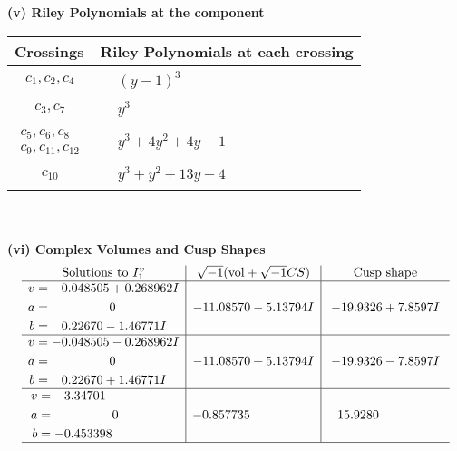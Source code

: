 \documentclass[1p]{elsarticle_modified}
\theoremstyle{definition}
\newcommand{\I}{\sqrt{-1}}
\begin{document}
\newpage\renewcommand{\arraystretch}{1}
\flushleft \textbf{(v) Riley Polynomials at the component}\newline \\
\begin{tabular}{m{50pt}|m{274pt}}
Crossings & \hspace{64pt}Riley Polynomials at each crossing \\
\hline $$\begin{aligned}c_{1},c_{2},c_{4}\end{aligned}$$&$\begin{aligned}
&(y-1)^3
\end{aligned}$\\
\hline $$\begin{aligned}c_{3},c_{7}\end{aligned}$$&$\begin{aligned}
&y^3
\end{aligned}$\\
\hline $$\begin{aligned}c_{5},c_{6},c_{8}\\c_{9},c_{11},c_{12}\end{aligned}$$&$\begin{aligned}
&y^3+4 y^2+4 y-1
\end{aligned}$\\
\hline $$\begin{aligned}c_{10}\end{aligned}$$&$\begin{aligned}
&y^3+y^2+13 y-4
\end{aligned}$\\
\hline
\end{tabular}\\~\\
\newpage\flushleft \textbf{(vi) Complex Volumes and Cusp Shapes}
$$\begin{array}{c|c|c}  
\text{Solutions to }I^v_{1}& \I (\text{vol} + \sqrt{-1}CS) & \text{Cusp shape}\\
 \hline 
\begin{aligned}
v &= -0.048505 + 0.268962 I \\
a &= \phantom{-0.000000 } 0 \\
b &= \phantom{-}0.22670 - 1.46771 I\end{aligned}
 & -11.08570 - 5.13794 I & -19.9326 + 7.8597 I \\ \hline\begin{aligned}
v &= -0.048505 - 0.268962 I \\
a &= \phantom{-0.000000 } 0 \\
b &= \phantom{-}0.22670 + 1.46771 I\end{aligned}
 & -11.08570 + 5.13794 I & -19.9326 - 7.8597 I \\ \hline\begin{aligned}
v &= \phantom{-}3.34701\phantom{ +0.000000I} \\
a &= \phantom{-0.000000 } 0 \\
b &= -0.453398\phantom{ +0.000000I}\end{aligned}
 & -0.857735\phantom{ +0.000000I} & \phantom{-}15.9280\phantom{ +0.000000I}\\
 \hline 
 \end{array}$$\newpage\newpage\renewcommand{\arraystretch}{1}
\end{document}
